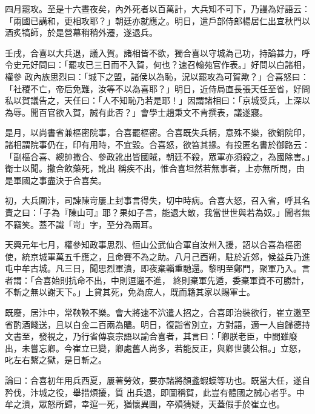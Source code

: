 \begin{pinyinscope}
 四月罷攻。至是十六晝夜矣，內外死者以百萬計，大兵知不可下，乃謾為好語云：「兩國已講和，更相攻耶？」朝廷亦就應之。明日，遣戶部侍郎楊居仁出宜秋門以酒炙犒師，於是營幕稍稍外遷，遂退兵。



 壬戌，合喜以大兵退，議入賀。諸相皆不欲，獨合喜以守城為己功，持論甚力，呼令史元好問曰：「罷攻已三日而不入賀，何也？速召翰苑官作表。」好問以白諸相，權參
 政內族思烈曰：「城下之盟，諸侯以為恥，況以罷攻為可賀歟？」合喜怒曰：「社稷不亡，帝后免難，汝等不以為喜耶？」明日，近侍局直長張天任至省，好問私以賀議告之，天任曰：「人不知恥乃若是耶！」因謂諸相曰：「京城受兵，上深以為辱。聞百官欲入賀，誠有此否？」會學士趙秉文不肯撰表，議遂寢。



 是月，以尚書省兼樞密院事，合喜罷樞密。合喜既失兵柄，意殊不樂，欲銷院印，諸相謂院事仍在，印有用時，不宜毀。合喜怒，欲笞其掾。有投匿名書於御路云：「副樞合喜、總帥撒合、參政訛出皆國賊，朝廷不殺，眾軍亦須殺之，為國除害。」衛士以聞。撒合飲藥死，訛出
 稱疾不出，惟合喜坦然若無事者，上亦無所問，由是軍國之事盡決于合喜矣。



 初，大兵圍汴，司諫陳岢屢上封事言得失，切中時病。合喜大怒，召入省，呼其名責之曰：「子為『陳山可』耶？果如子言，能退大敵，我當世世與若為奴。」聞者無不竊笑。蓋不識「岢」字，至分為兩耳。



 天興元年七月，權參知政事思烈、恒山公武仙合軍自汝州入援，詔以合喜為樞密使，統京城軍萬五千應之，且命賽不為之助。八月己酉朔，駐於近郊，候益兵乃進屯中牟古城。凡三日，聞思烈軍潰，即夜棄輜重馳還。黎明至鄭門，聚軍乃入。言者謂：「合喜始則抗命不出，中則逗遛不進，
 終則棄軍先遁，委棄軍資不可勝計，不斬之無以謝天下。」上貸其死，免為庶人，既而籍其家以賜軍士。



 既廢，居汴中，常鞅鞅不樂。會大將速不泬遣人招之，合喜即治裝欲行，崔立邀至省酌酒餞送，且以白金二百兩為贐。明日，復詣省別立，方對語，適一人自歸德持文書至，發視之，乃行省傳哀宗語以諭合喜者，其言曰：「卿朕老臣，中間雖廢出，未嘗忘卿。今崔立已變，卿處舊人尚多，若能反正，與卿世襲公相。」立怒，叱左右繫之獄，是日斬之。



 論曰：合喜初年用兵西夏，屢著勞效，要亦諸將顏盞蝦蟆等功也。既當大任，遂自矜伐，汴城之役，舉措煩擾，質
 出兵退，即圖稱賀，此豈有體國之誠心者乎。中牟之潰，眾怒所歸，幸逭一死，猶懷異圖，卒殞猜疑，天蓋假手於崔立也。



\end{pinyinscope}